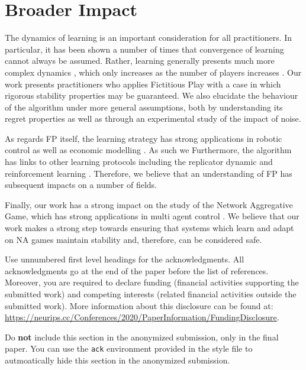 \documentclass{article}
\theoremstyle{definition}
\begin{document}
\section*{Broader Impact}

The dynamics of learning is an important consideration for all practitioners. In particular, it has
been shown a number of times \cite{noneqmbehaviour} that convergence of learning cannot always be
assumed. Rather, learning generally presents much more complex dynamics \cite{gallaandfarmer}, which
only increases as the number of players increases \cite{sanders}. Our work presents practitioners
who applies Fictitious Play with a case in which rigorous stability properties may be guaranteed.
We also elucidate the behaviour of the algorithm under more general assumptions, both by
understanding its regret properties as well as through an experimental study of the impact of noise.

As regards FP  itself, the learning strategy has strong applications in robotic control
\cite{Smyrnakis, Hernandez, Sharma} as well as economic modelling \cite{vonNeumann}. As such we
Furthermore, the algorithm has links to other learning protocols including the replicator dynamic
\cite{Benaim} and reinforcement learning \cite{LeslieandCollins}. Therefore, we believe that an
understanding of FP has subsequent impacts on a number of fields.

Finally, our work has a strong impact on the study of the Network Aggregative Game, which has strong
applications in multi agent control \cite{GrammaticoAggregativeControl}. We 
believe that our work makes a strong step towards ensuring that systems which learn and adapt on
NA games maintain stability and, therefore, can be considered safe.

\begin{ack}
Use unnumbered first level headings for the acknowledgments. All acknowledgments
go at the end of the paper before the list of references. Moreover, you are required to declare 
funding (financial activities supporting the submitted work) and competing interests (related financial activities outside the submitted work). 
More information about this disclosure can be found at: \url{https://neurips.cc/Conferences/2020/PaperInformation/FundingDisclosure}.


Do {\bf not} include this section in the anonymized submission, only in the final paper. You can use the \texttt{ack} environment provided in the style file to autmoatically hide this section in the anonymized submission.
\end{ack}
\end{document}
